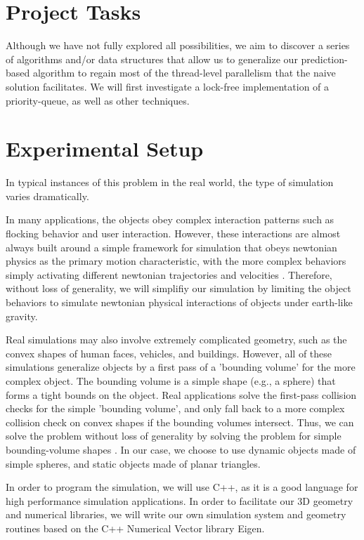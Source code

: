 \documentclass{article}
\begin{document}
\section*{Project Tasks}
Although we have not fully explored all possibilities, we aim to discover a series of algorithms and/or data structures that 
allow us to generalize our prediction-based algorithm to regain most of the thread-level parallelism that the naive solution facilitates.
We will first investigate a lock-free implementation of a priority-queue, as well as other techniques.

\section*{Experimental Setup}

In typical instances of this problem in the real world, the type of simulation varies dramatically.

In many applications, the objects obey complex interaction patterns such as flocking behavior and user interaction.  However, these interactions
are almost always built around a simple framework for simulation that obeys newtonian physics as the primary motion characteristic, with the more complex
behaviors simply activating different newtonian trajectories and velocities \cite{Jadbabaie02coordinationof}.  Therefore, without loss of generality, we will simplifiy our simulation by limiting
the object behaviors to simulate newtonian physical interactions of objects under earth-like gravity.

   Real simulations may also involve extremely complicated geometry, such as the convex shapes of human faces, vehicles, and buildings.  However, 
all of these simulations generalize objects by a first pass of a 'bounding volume' for the more complex object.  The bounding volume is a simple shape (e.g., a sphere)
that forms a tight bounds on the object.  Real applications solve the first-pass collision checks for the simple 'bounding volume', and only fall back to a more complex
collision check on convex shapes if the bounding volumes intersect.  Thus, we can solve the problem without loss of generality by solving the problem
for simple bounding-volume shapes \cite{uberflow,cloth}.  In our case, we choose to use dynamic objects made of simple spheres, and static objects made of planar triangles.

In order to program the simulation, we will use C++, as it is a good language for high performance simulation applications.  In order to facilitate our 
3D geometry and numerical libraries, we will write our own simulation system and geometry routines based on the C++ Numerical Vector library Eigen.  
\end{document}
